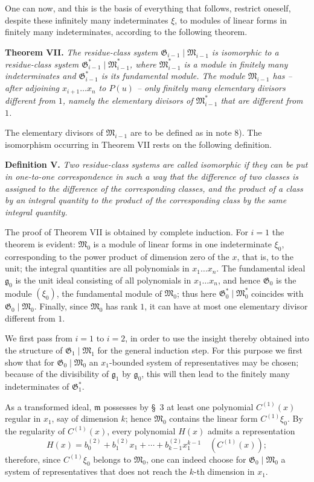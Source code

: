 \documentclass[11pt]{article}
\providecommand{\Gmod}{\mathfrak G}
\providecommand{\mideal}{\mathfrak m}
\providecommand{\gideal}{\mathfrak g}
\providecommand{\Gmod}{\mathfrak G}
\providecommand{\Mmod}{\mathfrak M}
\providecommand{\mideal}{\mathfrak m}
\providecommand{\gideal}{\mathfrak g}
\begin{document}
One can now, and this is the basis of everything that follows, restrict oneself, despite these infinitely many indeterminates $\xi$, to modules of linear forms in finitely many indeterminates, according to the following theorem.

\medskip
\noindent\textbf{Theorem VII.} \emph{The residue-class system $\Gmod_{i-1}\mid\Mmod_{i-1}$ is isomorphic to a residue-class system $\Gmod^*_{i-1}\mid\Mmod^*_{i-1}$, where $\Mmod^*_{i-1}$ is a module in finitely many indeterminates and $\Gmod^*_{i-1}$ is its fundamental module. The module $\Mmod_{i-1}$ has -- after adjoining $x_{i+1}\ldots x_n$ to $P(u)$ -- only finitely many elementary divisors different from $1$, namely the elementary divisors of $\Mmod^*_{i-1}$ that are different from $1$.}

The elementary divisors of $\Mmod_{i-1}$ are to be defined as in note 8). The isomorphism occurring in Theorem VII rests on the following definition.

\medskip
\noindent\textbf{Definition V.} \emph{Two residue-class systems are called isomorphic if they can be put in one-to-one correspondence in such a way that the difference of two classes is assigned to the difference of the corresponding classes, and the product of a class by an integral quantity to the product of the corresponding class by the same integral quantity.}

The proof of Theorem VII is obtained by complete induction. For $i=1$ the theorem is evident: $\Mmod_0$ is a module of linear forms in one indeterminate $\xi_0$, corresponding to the power product of dimension zero of the $x$, that is, to the unit; the integral quantities are all polynomials in $x_1\ldots x_n$. The fundamental ideal $\gideal_0$ is the unit ideal consisting of all polynomials in $x_1\ldots x_n$, and hence $\Gmod_0$ is the module $(\xi_0)$, the fundamental module of $\Mmod_0$; thus here $\Gmod^*_0\mid\Mmod^*_0$ coincides with $\Gmod_0\mid\Mmod_0$. Finally, since $\Mmod_0$ has rank $1$, it can have at most one elementary divisor different from $1$.

We first pass from $i=1$ to $i=2$, in order to use the insight thereby obtained into the structure of $\Gmod_1\mid\Mmod_1$ for the general induction step. For this purpose we first show that for $\Gmod_0\mid\Mmod_0$ an $x_1$-bounded system of representatives may be chosen; because of the divisibility of $\gideal_1$ by $\gideal_0$, this will then lead to the finitely many indeterminates of $\Gmod^*_1$.

As a transformed ideal, $\mideal$ possesses by §~3 at least one polynomial $C^{(1)}(x)$ regular in $x_1$, say of dimension $k$; hence $\Mmod_0$ contains the linear form $C^{(1)}\xi_0$. By the regularity of $C^{(1)}(x)$, every polynomial $H(x)$ admits a representation
\begin{equation}
 H(x)=b^{(2)}_0+b^{(2)}_1x_1+\cdots+b^{(2)}_{k-1}x_1^{k-1}\quad(C^{(1)}(x));
\tag{21}
\end{equation}
therefore, since $C^{(1)}\xi_0$ belongs to $\Mmod_0$, one can indeed choose for $\Gmod_0\mid\Mmod_0$ a system of representatives that does not reach the $k$-th dimension in $x_1$.
\end{document}
